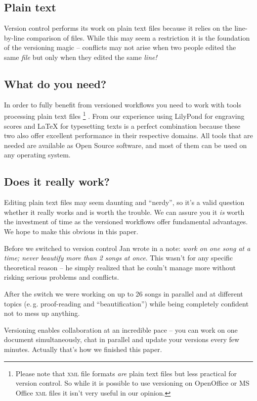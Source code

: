 \documentclass[11pt,a4paper]{article}
\begin{document}
\subsection{Plain text}
Version control performs its work on plain text files because it relies on the 
line-by-line comparison of files. While this may seem a restriction it is the
foundation of the versioning magic -- conflicts may not arise when two people edited the
same \emph{file} but only when they edited the same \emph{line!}

\subsection{What do you need?}
In order to fully benefit from versioned
workflows you need to work with tools processing plain text files%
\footnote{Please note that \textsc{xml} file formats \emph{are} plain text files
but less practical for version control. So while it is possible to use versioning on
OpenOffice or MS Office \textsc{xml} files it isn't very useful in our opinion.}
. From our experience
using LilyPond for engraving scores and \LaTeX{} for typesetting texts is a perfect
combination because these two also offer excellent performance in their respective domains.
All tools that are needed are available as Open Source software, and most of them can
be used on any operating system.

\subsection{Does it really work?}
Editing plain text files may seem daunting and “nerdy”, so it's a valid question
whether it really works and is worth the trouble. We can assure you it \emph{is} worth
the investment of time as the versioned workflows offer fundamental advantages.
We hope to make this obvious in this paper.

Before we switched to version control Jan wrote in a note: \emph{work on one song
at a time; \emph{never} beautify more than 2
songs at once}. This wasn't for any specific theoretical reason -- he simply realized
that he couln't manage more without risking serious problems and conflicts.

After the switch we were working on up to 26 songs in parallel and at different topics
(e.\,g. proof-reading and “beautification”) while being completely confident not to
mess up anything.

Versioning enables collaboration at an incredible pace -- you can work on one document
simultaneously, chat in parallel and update your versions every
few minutes. Actually that's how we finished this paper.
\end{document}
